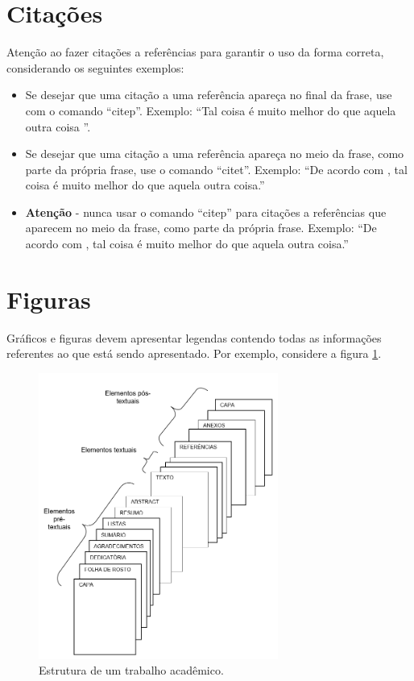 \section{Citações}

Atenção ao fazer citações a referências para garantir o uso da forma correta, considerando os seguintes exemplos:
\begin{itemize}
	\item Se desejar que uma citação a uma referência apareça no final da frase, use com o comando ``citep''. Exemplo: ``Tal coisa é muito melhor do que aquela outra coisa \citep{Beltrano2021}''.
	\item Se desejar que uma citação a uma referência apareça no meio da frase, como parte da própria frase, use o comando ``citet''. Exemplo: ``De acordo com \citet{Fulano2021}, tal coisa é muito melhor do que aquela outra coisa.''
	\item \textbf{Atenção} - nunca usar o comando ``citep'' para citações a referências que aparecem no meio da frase, como parte da própria frase. Exemplo: ``De acordo com \citep{Ciclano2021}, tal coisa é muito melhor do que aquela outra coisa.''
\end{itemize}

\clearpage

\section{Figuras}

Gráficos e figuras devem apresentar legendas contendo todas as informações referentes ao que está sendo apresentado. Por exemplo, considere a figura \ref{fig:C3_1}.

\begin{figure}[!h] 
	\centering
	\includegraphics[width=0.7\textwidth]{./cap3/figs/elementos.jpg}
	\caption{Estrutura de um trabalho acadêmico.}
	\label{fig:C3_1}
\end{figure}

